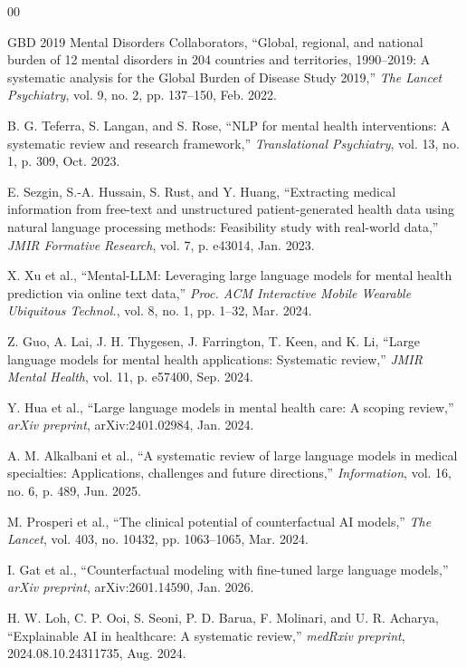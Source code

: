 \documentclass[conference]{IEEEtran}
\begin{document}
\begin{thebibliography}{00}

 GBD 2019 Mental Disorders Collaborators, ``Global, regional, and national burden of 12 mental disorders in 204 countries and territories, 1990--2019: A systematic analysis for the Global Burden of Disease Study 2019,'' \textit{The Lancet Psychiatry}, vol. 9, no. 2, pp. 137--150, Feb. 2022.

 B. G. Teferra, S. Langan, and S. Rose, ``NLP for mental health interventions: A systematic review and research framework,'' \textit{Translational Psychiatry}, vol. 13, no. 1, p. 309, Oct. 2023.

 E. Sezgin, S.-A. Hussain, S. Rust, and Y. Huang, ``Extracting medical information from free-text and unstructured patient-generated health data using natural language processing methods: Feasibility study with real-world data,'' \textit{JMIR Formative Research}, vol. 7, p. e43014, Jan. 2023.

 X. Xu et al., ``Mental-LLM: Leveraging large language models for mental health prediction via online text data,'' \textit{Proc. ACM Interactive Mobile Wearable Ubiquitous Technol.}, vol. 8, no. 1, pp. 1--32, Mar. 2024.

 Z. Guo, A. Lai, J. H. Thygesen, J. Farrington, T. Keen, and K. Li, ``Large language models for mental health applications: Systematic review,'' \textit{JMIR Mental Health}, vol. 11, p. e57400, Sep. 2024.

 Y. Hua et al., ``Large language models in mental health care: A scoping review,'' \textit{arXiv preprint}, arXiv:2401.02984, Jan. 2024.

 A. M. Alkalbani et al., ``A systematic review of large language models in medical specialties: Applications, challenges and future directions,'' \textit{Information}, vol. 16, no. 6, p. 489, Jun. 2025.

 M. Prosperi et al., ``The clinical potential of counterfactual AI models,'' \textit{The Lancet}, vol. 403, no. 10432, pp. 1063--1065, Mar. 2024.

 I. Gat et al., ``Counterfactual modeling with fine-tuned large language models,'' \textit{arXiv preprint}, arXiv:2601.14590, Jan. 2026.

 H. W. Loh, C. P. Ooi, S. Seoni, P. D. Barua, F. Molinari, and U. R. Acharya, ``Explainable AI in healthcare: A systematic review,'' \textit{medRxiv preprint}, 2024.08.10.24311735, Aug. 2024.


\end{thebibliography}
\end{document}
